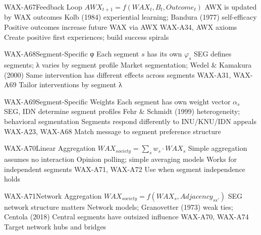 \begin{axiomspec}{WAX-A67}{Feedback Loop}
 $AWX_{t+1} = f(WAX_t, B_t, Outcome_t)$
 AWX is updated by WAX outcomes
 Kolb (1984) experiential learning; Bandura (1977) self-efficacy
 Positive outcomes increase future WAX via AWX
 WAX-A34, AWX axioms
 Create positive first experiences; build success spirals
\end{axiomspec}


\begin{axiomspec}{WAX-A68}{Segment-Specific φ}
 Each segment $s$ has its own $\varphi_s$
 SEG defines segments; λ varies by segment profile
 Market segmentation; Wedel \& Kamakura (2000)
 Same intervention has different effects across segments
 WAX-A31, WAX-A69
 Tailor interventions by segment λ
\end{axiomspec}

\begin{axiomspec}{WAX-A69}{Segment-Specific Weights}
 Each segment has own weight vector $\alpha_s$
 SEG, IDN determine segment profiles
 Fehr \& Schmidt (1999) heterogeneity; behavioral segmentation
 Segments respond differently to INU/KNU/IDN appeals
 WAX-A23, WAX-A68
 Match message to segment preference structure
\end{axiomspec}

\begin{axiomspec}{WAX-A70}{Linear Aggregation}
 $WAX_{society} = \sum_s w_s \cdot WAX_s$
 Simple aggregation assumes no interaction
 Opinion polling; simple averaging models
 Works for independent segments
 WAX-A71, WAX-A72
 Use when segment independence holds
\end{axiomspec}

\begin{axiomspec}{WAX-A71}{Network Aggregation}
 $WAX_{society} = f(WAX_s, Adjacency_{ss'})$
 SEG network structure matters
 Network models; Granovetter (1973) weak ties; Centola (2018)
 Central segments have outsized influence
 WAX-A70, WAX-A74
 Target network hubs and bridges
\end{axiomspec}

